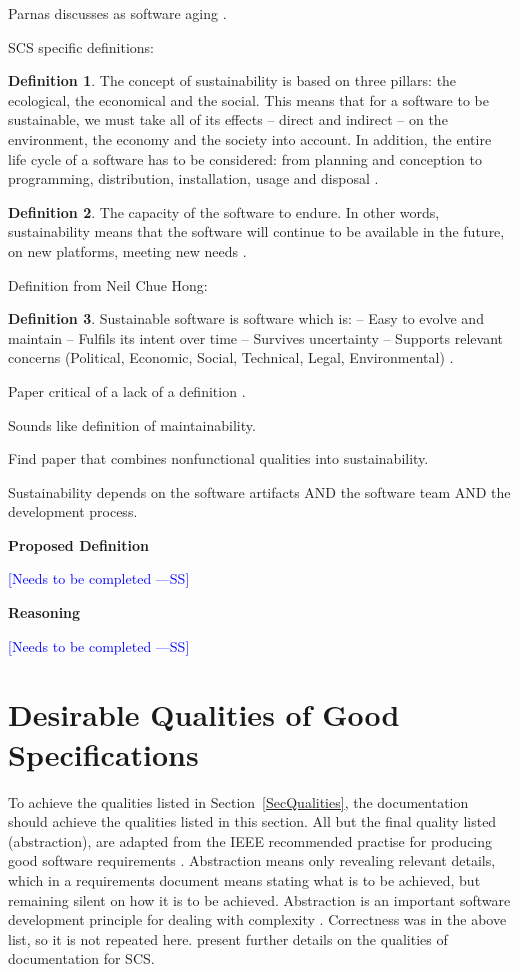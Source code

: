 \documentclass[letterpaper,cleveref]{lipics-v2019}
\newcommand{\authornote}[3]{\textcolor{#1}{[#3 ---#2]}}
\newcommand{\authornote}[3]{}
\newcommand{\wss}[1]{\authornote{blue}{SS}{#1}} %
\theoremstyle{definition}
\newtheorem{defn}{Definition}
\begin{document}
Parnas discusses as software aging \citep{Parnas1994a}.

SCS specific definitions:

\begin{defn}
  The concept of sustainability is based on three pillars: the
  ecological, the economical and the social. This means that for a software to
  be sustainable, we must take all of its effects -- direct and indirect -- on
  the environment, the economy and the society into account. In addition, the
  entire life cycle of a software has to be considered: from planning and
  conception to programming, distribution, installation, usage and
  disposal \citep{Heine2017}.
\end{defn}

\begin{defn}
  \noindent The capacity of the software to endure. In other words,
  sustainability means that the software will continue to be available in the
  future, on new platforms, meeting new needs \citep{Katz2016}.
\end{defn}

Definition from Neil Chue Hong:
\begin{defn}
Sustainable software is software which is:
-- Easy to evolve and maintain
-- Fulfils its intent over time
-- Survives uncertainty
-- Supports relevant concerns (Political, Economic, Social, Technical,
Legal, Environmental) \citep{Katz2016}.
\end{defn}

Paper critical of a lack of a definition \citep{VentersEtAl2014}.

Sounds like definition of maintainability.

Find paper that combines nonfunctional qualities into sustainability.

Sustainability depends on the software artifacts AND the software team AND the
development process.

\noindent \textbf{Proposed Definition} 

\wss{Needs to be completed}

\noindent \textbf{Reasoning}

\wss{Needs to be completed}

\section{Desirable Qualities of Good Specifications} \label{SecDesirableQs}

To achieve the qualities listed in Section~\ref{SecQualities}, the documentation
should achieve the qualities listed in this section.  All but the final quality
listed (abstraction), are adapted from the IEEE recommended practise for
producing good software requirements \citep{IEEE1998}.  Abstraction means only
revealing relevant details, which in a requirements document means stating what
is to be achieved, but remaining silent on how it is to be achieved.
Abstraction is an important software development principle for dealing with
complexity \citep[p.~40]{GhezziEtAl2003}.  Correctness was in the above list, so
it is not repeated here.  \citet{SmithAndKoothoor2016} present further details
on the qualities of documentation for SCS.
\end{document}

